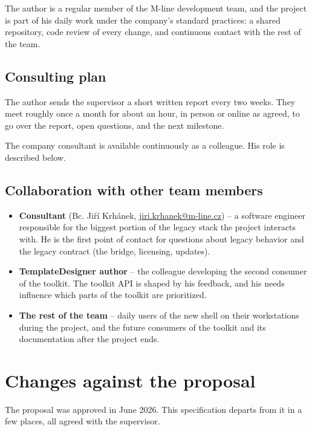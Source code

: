 \documentclass{article}
\begin{document}
The author is a regular member of the M-line development team, and the project is part of his daily work under the company's standard practices: a shared repository, code review of every change, and continuous contact with the rest of the team.

\subsection{Consulting plan}

The author sends the supervisor a short written report every two weeks. They meet roughly once a month for about an hour, in person or online as agreed, to go over the report, open questions, and the next milestone.

The company consultant is available continuously as a colleague. His role is described below.

\subsection{Collaboration with other team members}

\begin{itemize}
  \item \textbf{Consultant} (Bc. Jiří Krhánek, \href{mailto:jiri.krhanek@m-line.cz}{jiri.krhanek@m-line.cz}) -- a software engineer responsible for the biggest portion of the legacy stack the project interacts with. He is the first point of contact for questions about legacy behavior and the legacy contract (the bridge, licensing, updates).
  \item \textbf{TemplateDesigner author} -- the colleague developing the second consumer of the toolkit. The toolkit API is shaped by his feedback, and his needs influence which parts of the toolkit are prioritized.
  \item \textbf{The rest of the team} -- daily users of the new shell on their workstations during the project, and the future consumers of the toolkit and its documentation after the project ends.
\end{itemize}

\section{Changes against the proposal}
\label{sec:changes}

The proposal was approved in June 2026. This specification departs from it in a few places, all agreed with the supervisor.
\end{document}
